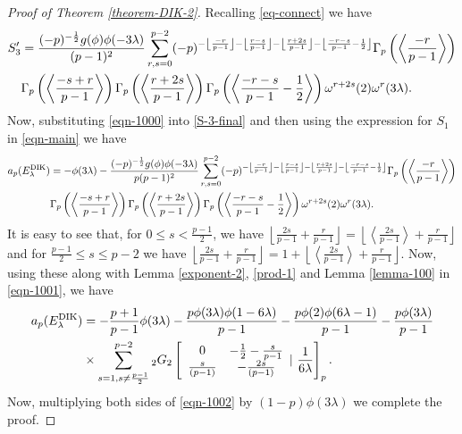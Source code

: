 \documentclass[12pt]{amsart}
\theoremstyle{plain}
\theoremstyle{definition}
\theoremstyle{remark}
\newcommand{\dik}{\text{{\rm{DIK}}}}
\numberwithin{equation}{section}
\begin{document}
\begin{proof}[Proof of Theorem \ref{theorem-DIK-2}]
 Recalling \eqref{eq-connect} we have 
\begin{align}\label{eqn-1000}
S_3'&=\frac{(-p)^{-\frac{1}{2}}g(\phi) \phi(-3\lambda)}{(p-1)^2} 
\sum_{r,s=0}^{p-2}(-p)^{-\left\lfloor\frac{-r}{p-1}\right\rfloor-\left\lfloor\frac{r-s}{p-1}\right\rfloor-\left\lfloor\frac{r+2s}{p-1}\right\rfloor-\left\lfloor\frac{-r-s}{p-1}-\frac{1}{2}\right\rfloor}\Gamma_p\left(\left\langle\frac{-r}{p-1}\right\rangle\right)\notag\\ 
  &\Gamma_p\left(\left\langle\frac{-s+r}{p-1}\right\rangle\right)\Gamma_p\left(\left\langle\frac{r+2s}{p-1}\right\rangle\right)\Gamma_p\left(\left\langle\frac{-r-s}{p-1}-\frac{1}{2}\right\rangle\right){\omega}^{r+2s}(2) {\omega}^{r}(3\lambda).
\end{align}
Now, substituting \eqref{eqn-1000} into \eqref{S-3-final} and then using the expression for $S_1$ in \eqref{eqn-main} we have 
\begin{align}\label{eqn-1001}
a_p(E^{\dik}_{\lambda})&=-\phi(3\lambda) -
\frac{(-p)^{-\frac{1}{2}}g(\phi) \phi(-3\lambda)}{p(p-1)^2} 
\sum_{r,s=0}^{p-2}(-p)^{-\left\lfloor\frac{-r}{p-1}\right\rfloor-\left\lfloor\frac{r-s}{p-1}\right\rfloor-\left\lfloor\frac{r+2s}{p-1}\right\rfloor-\left\lfloor\frac{-r-s}{p-1}-\frac{1}{2}\right\rfloor}\Gamma_p\left(\left\langle\frac{-r}{p-1}\right\rangle\right)\notag\\ 
  &\Gamma_p\left(\left\langle\frac{-s+r}{p-1}\right\rangle\right)\Gamma_p\left(\left\langle\frac{r+2s}{p-1}\right\rangle\right)\Gamma_p\left(\left\langle\frac{-r-s}{p-1}-\frac{1}{2}\right\rangle\right){\omega}^{r+2s}(2) {\omega}^{r}(3\lambda).
\end{align}
It is easy to see that, for $0\leq s< \frac{p-1}{2}$, we have $\left\lfloor\frac{2s}{p-1}+\frac{r}{p-1}\right\rfloor=\left\lfloor\left\langle\frac{2s}{p-1}\right\rangle+\frac{r}{p-1}\right\rfloor$ and for $\frac{p-1}{2}\leq s\leq p-2$ we have 
$\left\lfloor\frac{2s}{p-1}+\frac{r}{p-1}\right\rfloor=1+\left\lfloor\left\langle\frac{2s}{p-1}\right\rangle+\frac{r}{p-1}\right\rfloor.$
Now, using these along with Lemma \ref{exponent-2}, \eqref{prod-1} and Lemma \ref{lemma-100} in \eqref{eqn-1001}, we have 
\begin{align}\label{eqn-1002}
a_p(E^{\dik}_{\lambda})&=-\frac{p+1}{p-1}\phi(3\lambda)-\frac{p\phi(3\lambda)\phi(1-6\lambda)}{p-1}-\frac{p\phi(2)\phi(6\lambda-1)}{p-1}-\frac{p\phi(3\lambda)}{p-1} \notag\\
&\times \sum_{s=1,s\neq \frac{p-1}{2}}^{p-2}
{_2G_2}\left[\begin{array}{cc}
  0   & -\frac{1}{2} -\frac{s}{p-1} \\
  \frac{s}{(p-1)}    & -\frac{2s}{(p-1)} \end{array}|\ \frac{1}{6\lambda} \right]_p.
\end{align}
Now, multiplying both sides of \eqref{eqn-1002} by $(1-p)\phi(3\lambda)$ we complete the proof.
\end{proof}
\end{document}

